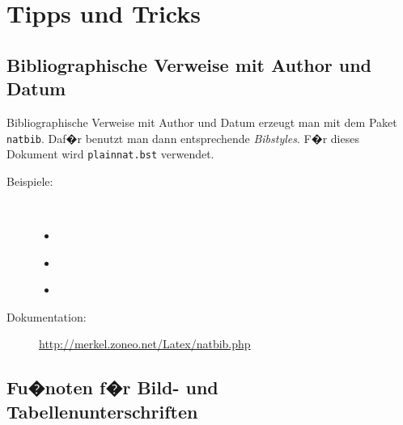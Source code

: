 
\chapter{Tipps und Tricks}
\label{sec:tat}






\section{Bibliographische Verweise mit Author und Datum}

Bibliographische Verweise mit Author und Datum erzeugt man mit dem Paket
\texttt{natbib}. Daf�r benutzt man dann entsprechende \emph{Bibstyles}. F�r
dieses Dokument wird \texttt{plainnat.bst} verwendet.

\begin{description}
\item[Beispiele:] \
  \begin{itemize}
  \item \citet{AhoHU74}
  \item \citet[chap. 2]{AhoHU74}
  \item \citep[see][chap. 2]{AhoHU74}
  \end{itemize}
\item[Dokumentation:] \url{http://merkel.zoneo.net/Latex/natbib.php}
\end{description}


\section{Fu�noten f�r Bild- und Tabellenunterschriften}
\label{sec:footnotecaption}

